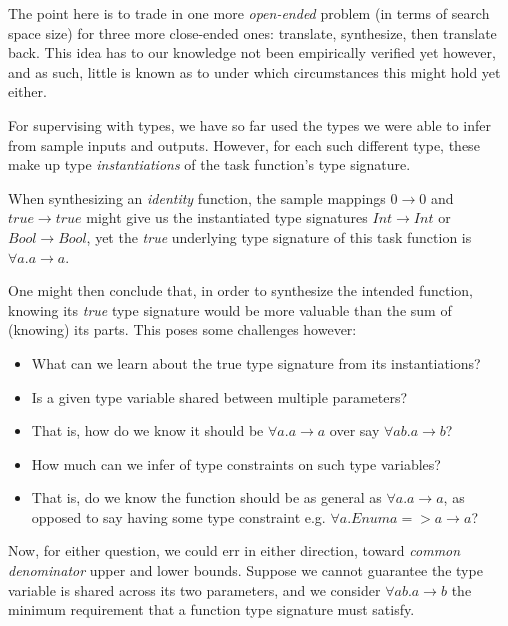 \documentclass{article}
\begin{document}
    The point here is to trade in one more \emph{open-ended} problem (in terms of search space size) for three more close-ended ones:
    translate, synthesize, then translate back.
    This idea has to our knowledge not been empirically verified yet however,
    and as such, little is known as to under which circumstances this might hold yet either. 

    For supervising with types, we have so far used the types we were able to infer from sample inputs and outputs.
    However, for each such different type,
    these make up type \emph{instantiations} of the task function's type signature.

    When synthesizing an \emph{identity} function,
    the sample mappings $0 \rightarrow 0$ and $true \rightarrow true$
    might give us the instantiated type signatures
    $Int \rightarrow Int$ or $Bool \rightarrow Bool$,
    yet the \emph{true} underlying type signature of this task function is $\forall a . a \rightarrow a$.

    One might then conclude that, in order to synthesize the intended function,
    knowing its \emph{true} type signature would be more valuable than the sum of (knowing) its parts.
    This poses some challenges however:

    \begin{itemize}
        \item What can we learn about the true type signature from its instantiations?
        \item Is a given type variable shared between multiple parameters?
        \item That is, how do we know it should be $\forall a . a \rightarrow a$ over say $\forall a b . a \rightarrow b$?
        \item How much can we infer of type constraints on such type variables?
        \item That is, do we know the function should be as general as $\forall a . a \rightarrow a$, as opposed to say having some type constraint e.g. $\forall a . Enum a => a \rightarrow a$?
    \end{itemize}

    Now, for either question, we could err in either direction, toward \emph{common denominator} upper and lower bounds.
    Suppose we cannot guarantee the type variable is shared across its two parameters,
    and we consider $\forall a b . a \rightarrow b$ the minimum requirement that a function type signature must satisfy.
\end{document}
